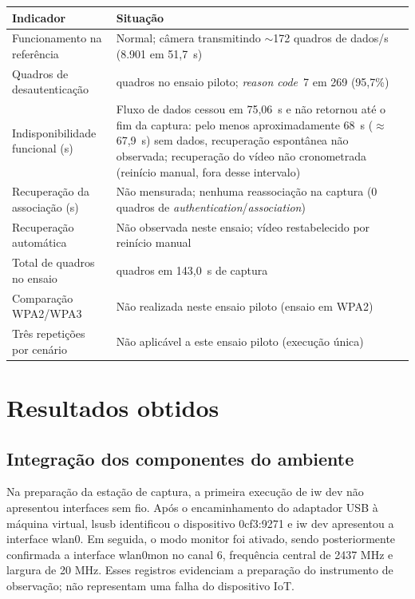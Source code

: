 \begin{quadro}[htbp]
\centering
\caption{Situação das métricas no ensaio piloto}
\label{quad:situacao-metricas-ref}
\small
\begin{tabular}{|>{\raggedright\arraybackslash}p{}|>{\raggedright\arraybackslash}p{}|}
\hline
\textbf{Indicador} & \textbf{Situação} \\ \hline
Funcionamento na referência & Normal; câmera transmitindo $\sim$172 quadros de dados/s (8.901 em 51,7~s) \\ \hline
Quadros de desautenticação & 281 quadros no ensaio piloto; \textit{reason code}~7 em 269 (95,7\%) \\ \hline
Indisponibilidade funcional (s) & Fluxo de dados cessou em 75,06~s e não retornou até o fim da captura: pelo menos aproximadamente 68~s ($\approx$67,9~s) sem dados, recuperação espontânea não observada; recuperação do vídeo não cronometrada (reinício manual, fora desse intervalo) \\ \hline
Recuperação da associação (s) & Não mensurada; nenhuma reassociação na captura (0 quadros de \textit{authentication}/\textit{association}) \\ \hline
Recuperação automática & Não observada neste ensaio; vídeo restabelecido por reinício manual \\ \hline
Total de quadros no ensaio & 46.093 quadros em 143,0~s de captura \\ \hline
Comparação WPA2/WPA3 & Não realizada neste ensaio piloto (ensaio em WPA2) \\ \hline
Três repetições por cenário & Não aplicável a este ensaio piloto (execução única) \\ \hline
\end{tabular}
\end{quadro}

\section{Resultados obtidos}

\subsection{Integração dos componentes do ambiente}

Na preparação da estação de captura, a primeira execução de iw dev não apresentou interfaces sem fio. Após o encaminhamento do adaptador USB à máquina virtual, lsusb identificou o dispositivo 0cf3:9271 e iw dev apresentou a interface wlan0. Em seguida, o modo monitor foi ativado, sendo posteriormente confirmada a interface wlan0mon no canal 6, frequência central de 2437 MHz e largura de 20 MHz. Esses registros evidenciam a preparação do instrumento de observação; não representam uma falha do dispositivo IoT.



